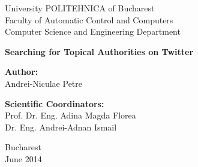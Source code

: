 \thispagestyle{empty}
\begin{center}
\large
University POLITEHNICA of Bucharest \\
Faculty of Automatic Control and Computers \\
Computer Science and Engineering Department \\

{\LARGE
	\textbf{Searching for Topical Authorities on Twitter}
}

\vspace{3cm}
\textbf{Author:}\\
Andrei-Niculae Petre

\bigskip
\bigskip

\textbf{Scientific Coordinators:}\\
Prof. Dr. Eng. Adina Magda Florea \\
Dr. Eng. Andrei-Adnan Ismail

Bucharest\\
June 2014 \\
\vspace*{1cm}
\end{center}
